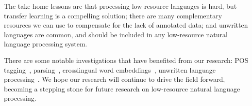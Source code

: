 \documentclass[12pt,twoside,final,hidelinks]{ltthesis}
\theoremstyle{definition}
\begin{document}
The take-home lessons are that processing low-resource languages is hard, but transfer learning is a compelling solution; there are many complementary resources we can use to compensate for the lack of annotated data; and unwritten languages are common, and should be included in any low-resource natural language processing system.  

There are some
notable investigations that have benefited from our research: POS tagging~\cite{DBLP:conf/conll/FangC16,Pecheux2016,zhang-EtAl:2016:N16-13,bacskaya2016semi}, parsing~\cite{DBLP:journals/corr/GillickBVS15,Guo:2016:RLF:3016100.3016284,TACL892,DBLP:journals/corr/GuoCWL16,ledbetter-dickinson:2016:BEA11,TACL917}, crosslingual word embeddings~\cite{zhang2017bilingual,vulic-eacl:2017,heyman-etal-eacl:2017}, unwritten language processing~\cite{DBLP:journals/corr/BansalKGL16,adams-EtAl:2016:EMNLP2016,anastasopoulos-chiang-duong:2016:EMNLP2016,Wilkinson+2016}. We hope our research will continue to drive the field forward, becoming a stepping stone for future research on low-resource natural language processing. 


% 

%


%


%



%

\footnotesize

\normalsize
%

\end{document}
